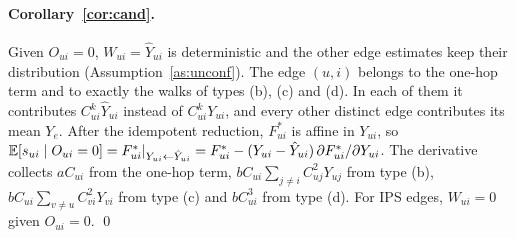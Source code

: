 \paragraph{Corollary~\ref{cor:cand}.}
Given $O_{ui}=0$, $W_{ui}=\hat Y_{ui}$ is deterministic and the other edge
estimates keep their distribution (Assumption~\ref{as:unconf}). The edge $(u,i)$
belongs to the one-hop term and to exactly the walks of types (b), (c) and (d).
In each of them it contributes $C_{ui}^{k}\hat Y_{ui}$ instead of $C_{ui}^kY_{ui}$,
and every other distinct edge contributes its mean $Y_e$. After the idempotent
reduction, $F^*_{ui}$ is affine in $Y_{ui}$, so
$\mathbb{E}[s_{ui}\mid O_{ui}=0]=F^*_{ui}|_{Y_{ui}\leftarrow\hat Y_{ui}}=F^*_{ui}-(Y_{ui}-\hat Y_{ui})\,\partial F^*_{ui}/\partial Y_{ui}$.
The derivative collects $aC_{ui}$ from the one-hop term,
$bC_{ui}\sum_{j\ne i}C_{uj}^2Y_{uj}$ from type (b),
$bC_{ui}\sum_{v\ne u}C_{vi}^2Y_{vi}$ from type (c) and $bC_{ui}^3$ from type (d).
For IPS edges, $W_{ui}=0$ given $O_{ui}=0$. \qed

